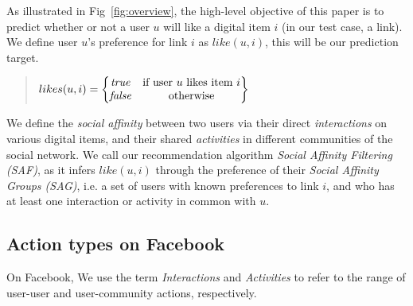 

As illustrated in Fig~\ref{fig:overview}, the high-level objective of this paper is to predict whether or not a user $u$ will like a digital item $i$ (in our test case, a link). 
We define user $u$'s preference for link $i$ as $like(u,i)$, this will be our prediction target. 
\begin{quote}
\begin{math}
likes(u,i) =  \begin{Bmatrix}
	  \true & \text{if user $u$ likes item $i$}\\
	  \false & \text{otherwise}
	  \end{Bmatrix}
\end{math}
\end{quote}

We define the \textit{social affinity} between two users via their direct {\em interactions}
on various digital items, and their shared {\em activities} in different communities of the social network. 
We call our recommendation algorithm \textit{Social Affinity Filtering (SAF)}, as it infers 
$like(u,i)$ through the preference of their 
\textit{ Social Affinity Groups (SAG)}, i.e. a set of users with known preferences to link $i$, and who has at least one interaction or activity in common with $u$. 

\subsection{Action types on Facebook}
On Facebook, We use the term {\em Interactions} and {\em Activities} to refer to the range of user-user and user-community actions, respectively.

